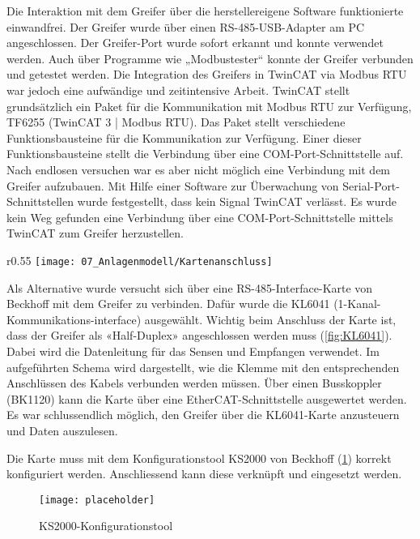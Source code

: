 		Die Interaktion mit dem Greifer über die herstellereigene Software funktionierte einwandfrei. Der Greifer wurde über einen RS-485-USB-Adapter am PC angeschlossen. Der Greifer-Port wurde sofort erkannt und konnte verwendet werden. Auch über Programme wie „Modbustester“ konnte der Greifer verbunden und getestet werden. Die Integration des Greifers in TwinCAT via Modbus RTU war jedoch eine aufwändige und zeitintensive Arbeit. TwinCAT stellt grundsätzlich ein Paket für die Kommunikation mit Modbus RTU zur Verfügung, TF6255 (TwinCAT 3 | Modbus RTU). Das Paket stellt verschiedene Funktionsbausteine für die Kommunikation zur Verfügung. Einer dieser Funktionsbausteine stellt die Verbindung über eine COM-Port-Schnittstelle auf. Nach endlosen versuchen war es aber nicht möglich eine Verbindung mit dem Greifer aufzubauen. Mit Hilfe einer Software zur Überwachung von Serial-Port-Schnittstellen wurde festgestellt, dass kein Signal TwinCAT verlässt. Es wurde kein Weg gefunden eine Verbindung über eine COM-Port-Schnittstelle mittels TwinCAT zum Greifer herzustellen.
		\\
		\vspace{-5mm} 
		\begin{wrapfigure}{r}{0.55\textwidth}
			\centering
			\texttt{[image: 07\_Anlagenmodell/Kartenanschluss]}
			\captionsetup{justification=centering}
			\caption{Anschluss der Beckhoff-Karte}
			\label{fig:KL6041}
		\end{wrapfigure}
		Als Alternative wurde versucht sich über eine RS-485-Interface-Karte von Beckhoff mit dem Greifer zu verbinden. Dafür wurde die KL6041 (1-Kanal-Kommunikations-interface) ausgewählt. Wichtig beim Anschluss der Karte ist, dass der Greifer als «Half-Duplex» angeschlossen werden muss (\ref{fig:KL6041}). Dabei wird die Datenleitung für das Sensen und Empfangen verwendet. Im aufgeführten Schema wird dargestellt, wie die Klemme mit den entsprechenden Anschlüssen des Kabels verbunden werden müssen. Über einen Busskoppler (BK1120) kann die Karte über eine EtherCAT-Schnittstelle ausgewertet werden. Es war schlussendlich möglich, den Greifer über die KL6041-Karte anzusteuern und Daten auszulesen. 
		
		\newpage
		
		Die Karte muss mit dem Konfigurationstool KS2000 von Beckhoff (\ref{fig:KS2000}) korrekt konfiguriert werden. Anschliessend  kann diese verknüpft und eingesetzt werden. 
		
		\begin{figure}[H]
			\centering
			\texttt{[image: placeholder]}
			\captionsetup{justification=centering}
			\caption{KS2000-Konfigurationstool}
			\label{fig:KS2000}
		\end{figure}
		

